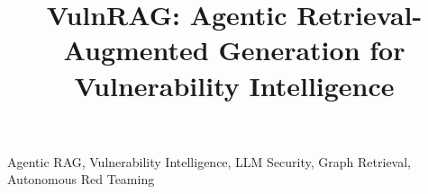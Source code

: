 \documentclass[conference]{IEEEtran}
\begin{document}
\title{VulnRAG: Agentic Retrieval-Augmented Generation for Vulnerability Intelligence}

\author{
}

\maketitle





\begin{IEEEkeywords}
Agentic RAG, Vulnerability Intelligence, LLM Security, Graph Retrieval, Autonomous Red Teaming
\end{IEEEkeywords}













\end{document}
